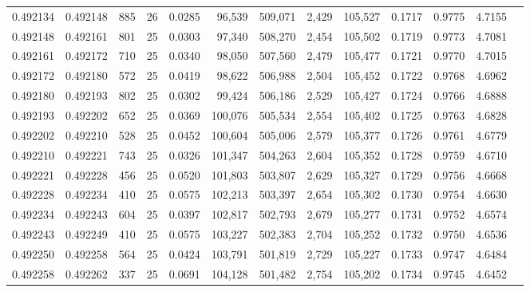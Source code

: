 \begin{tabular}{rrrrrrrrrrrrr}
0.492134 & 0.492148 &   885 &  26 &                                     0.0285 &  96,539 & 509,071 &   2,429 & 105,527 & 0.1717 & 0.9775 & 4.7155 \\
0.492148 & 0.492161 &   801 &  25 &                                     0.0303 &  97,340 & 508,270 &   2,454 & 105,502 & 0.1719 & 0.9773 & 4.7081 \\
0.492161 & 0.492172 &   710 &  25 &                                     0.0340 &  98,050 & 507,560 &   2,479 & 105,477 & 0.1721 & 0.9770 & 4.7015 \\
0.492172 & 0.492180 &   572 &  25 &                                     0.0419 &  98,622 & 506,988 &   2,504 & 105,452 & 0.1722 & 0.9768 & 4.6962 \\
0.492180 & 0.492193 &   802 &  25 &                                     0.0302 &  99,424 & 506,186 &   2,529 & 105,427 & 0.1724 & 0.9766 & 4.6888 \\
0.492193 & 0.492202 &   652 &  25 &                                     0.0369 & 100,076 & 505,534 &   2,554 & 105,402 & 0.1725 & 0.9763 & 4.6828 \\
0.492202 & 0.492210 &   528 &  25 &                                     0.0452 & 100,604 & 505,006 &   2,579 & 105,377 & 0.1726 & 0.9761 & 4.6779 \\
0.492210 & 0.492221 &   743 &  25 &                                     0.0326 & 101,347 & 504,263 &   2,604 & 105,352 & 0.1728 & 0.9759 & 4.6710 \\
0.492221 & 0.492228 &   456 &  25 &                                     0.0520 & 101,803 & 503,807 &   2,629 & 105,327 & 0.1729 & 0.9756 & 4.6668 \\
0.492228 & 0.492234 &   410 &  25 &                                     0.0575 & 102,213 & 503,397 &   2,654 & 105,302 & 0.1730 & 0.9754 & 4.6630 \\
0.492234 & 0.492243 &   604 &  25 &                                     0.0397 & 102,817 & 502,793 &   2,679 & 105,277 & 0.1731 & 0.9752 & 4.6574 \\
0.492243 & 0.492249 &   410 &  25 &                                     0.0575 & 103,227 & 502,383 &   2,704 & 105,252 & 0.1732 & 0.9750 & 4.6536 \\
0.492250 & 0.492258 &   564 &  25 &                                     0.0424 & 103,791 & 501,819 &   2,729 & 105,227 & 0.1733 & 0.9747 & 4.6484 \\
0.492258 & 0.492262 &   337 &  25 &                                     0.0691 & 104,128 & 501,482 &   2,754 & 105,202 & 0.1734 & 0.9745 & 4.6452 \\

\end{tabular}
